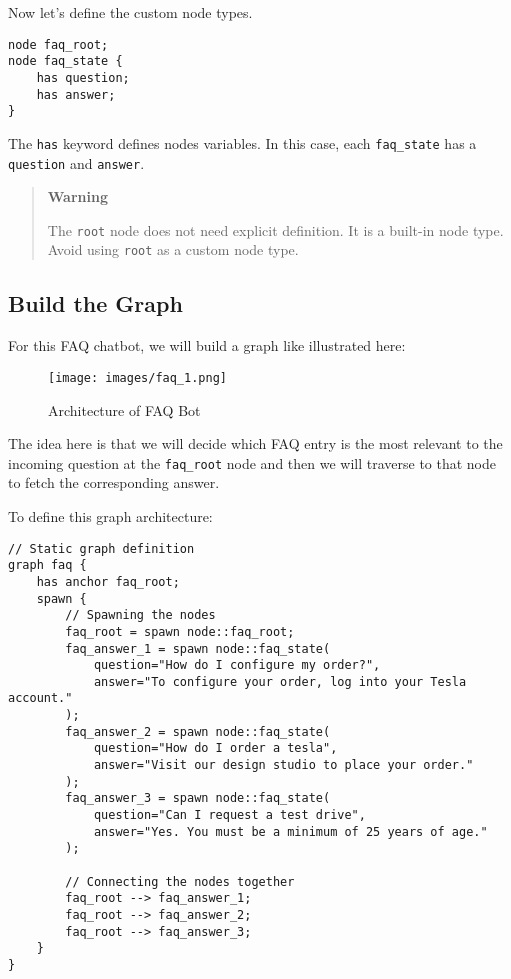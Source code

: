 Now let's define the custom node types.

\begin{lstlisting}
node faq_root;
node faq_state {
    has question;
    has answer;
}
\end{lstlisting}

The \lstinline!has! keyword defines nodes variables. In this case, each
\lstinline!faq_state! has a \lstinline!question! and \lstinline!answer!.

\begin{quote}
    \textbf{Warning}

    The \lstinline!root! node does not need explicit definition. It is a
    built-in node type. Avoid using \lstinline!root! as a custom node type.
\end{quote}

\subsection{Build the Graph}\label{build-the-graph}

For this FAQ chatbot, we will build a graph like illustrated here:

\begin{figure}
    \centering
    \texttt{[image: images/faq\_1.png]}
    \caption{Architecture of FAQ Bot}
\end{figure}

The idea here is that we will decide which FAQ entry is the most
relevant to the incoming question at the \lstinline!faq_root! node and
then we will traverse to that node to fetch the corresponding answer.

To define this graph architecture:

\begin{lstlisting}
// Static graph definition
graph faq {
    has anchor faq_root;
    spawn {
        // Spawning the nodes
        faq_root = spawn node::faq_root;
        faq_answer_1 = spawn node::faq_state(
            question="How do I configure my order?",
            answer="To configure your order, log into your Tesla account."
        );
        faq_answer_2 = spawn node::faq_state(
            question="How do I order a tesla",
            answer="Visit our design studio to place your order."
        );
        faq_answer_3 = spawn node::faq_state(
            question="Can I request a test drive",
            answer="Yes. You must be a minimum of 25 years of age."
        );

        // Connecting the nodes together
        faq_root --> faq_answer_1;
        faq_root --> faq_answer_2;
        faq_root --> faq_answer_3;
    }
}
\end{lstlisting}

